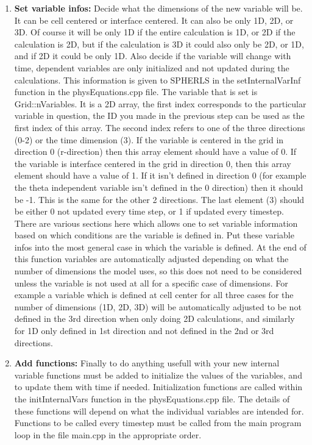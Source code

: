 \documentclass[12pt,a4paper]{book}
\begin{document}
\begin{itemize}
\begin{enumerate}
\item \textbf{Set variable infos:} Decide what the dimensions of the new variable will be. It can be cell centered or interface centered. It can also be only 1D, 2D, or 3D. Of course it will be only 1D if the entire calculation is 1D, or 2D if the calculation is 2D, but if the calculation is 3D it could also only be 2D, or 1D, and if 2D it could be only 1D. Also decide if the variable will change with time, dependent variables are only initialized and not updated during the calculations. This information is given to SPHERLS in the setInternalVarInf function in the physEquations.cpp file. The variable that is set is Grid::nVariables. It is a 2D array, the first index corresponds to the particular variable in question, the ID you made in the previous step can be used as the first index of this array. The second index refers to one of the three directions (0-2) or the time dimension (3). If the variable is centered in the grid in direction 0 (r-direction) then this array element should have a value of 0. If the variable is interface centered in the grid in direction 0, then this array element should have a value of 1. If it isn't defined in direction 0 (for example the theta independent variable isn't defined in the 0 direction) then it should be -1. This is the same for the other 2 directions. The last element (3) should be either 0 not updated every time step, or 1 if updated every timestep. There are various sections here which allows one to set variable information based on which conditions are the variable is defined in. Put these variable infos into the most general case in which the variable is defined. At the end of this function variables are automatically adjusted depending on what the number of dimensions the model uses, so this does not need to be considered unless the variable is not used at all for a specific case of dimensions. For example a variable which is defined at cell center for all three cases for the number of dimensions (1D, 2D, 3D) will be automatically adjusted to be not defined in the 3rd direction when only doing 2D calculations, and similarly for 1D only defined in 1st direction and not defined in the 2nd or 3rd directions.
\item \textbf{Add functions:} Finally to do anything usefull with your new internal variable functions must be added to initialize the values of the variables, and to update them with time if needed. Initialization functions are called within the initInternalVars function in the physEquations.cpp file. The details of these functions will depend on what the individual variables are intended for. Functions to be called every timestep must be called from the main program loop in the file main.cpp in the appropriate order.

\end{enumerate}
\end{itemize}
\end{document}
